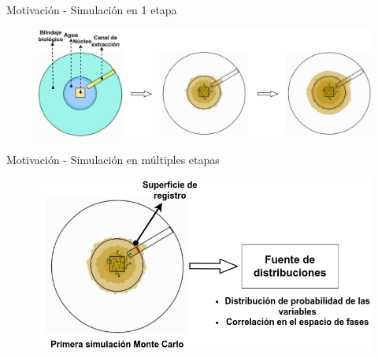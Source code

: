 \documentclass[aspectratio=169,english]{beamer}
\begin{document}
\begin{frame}{Motivación - Simulación en 1 etapa}
    \begin{figure}
        \centering
        \includegraphics[width=1\linewidth]{imagens/nucleo3.png}
    \end{figure}
\end{frame}


\begin{frame}{Motivación - Simulación en múltiples etapas}

    \begin{figure}
        \centering
        \includegraphics[width=0.83\linewidth]{imagens/nucleo5.png}
    \end{figure}
\end{frame}
\end{document}
